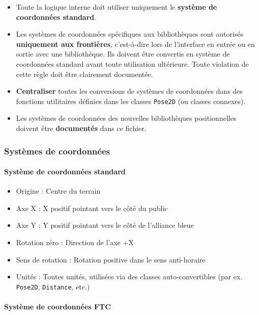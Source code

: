 \documentclass[12pt, a4paper]{report}
\begin{document}
    \begin{itemize}
        \item Toute la logique interne doit utiliser uniquement le \textbf{système de coordonnées standard}.
        \item Les systèmes de coordonnées spécifiques aux bibliothèques sont autorisés \textbf{uniquement aux frontières}, c'est-à-dire lors de l'interface en entrée ou en sortie avec une bibliothèque. Ils doivent être convertis en système de coordonnées standard avant toute utilisation ultérieure. Toute violation de cette règle doit être clairement documentée.
        \item \textbf{Centraliser} toutes les conversions de systèmes de coordonnées dans des fonctions utilitaires définies dans les classes \texttt{Pose2D} (ou classes connexes).
        \item Les systèmes de coordonnées des nouvelles bibliothèques positionnelles doivent être \textbf{documentés} dans ce fichier.
    \end{itemize}

    \subsubsection*{Systèmes de coordonnées}
    \label{coordinate-systems}

    \paragraph{Système de coordonnées standard}

    \begin{itemize}
        \item Origine : Centre du terrain
        \item Axe X : X positif pointant vers le côté du public
        \item Axe Y : Y positif pointant vers le côté de l'alliance bleue
        \item Rotation zéro : Direction de l'axe +X
        \item Sens de rotation : Rotation positive dans le sens anti-horaire
        \item Unités : Toutes unités, utilisées via des classes auto-convertibles (par ex. \texttt{Pose2D}, \texttt{Distance}, etc.)
    \end{itemize}


    \paragraph{Système de coordonnées FTC}
\end{document}
